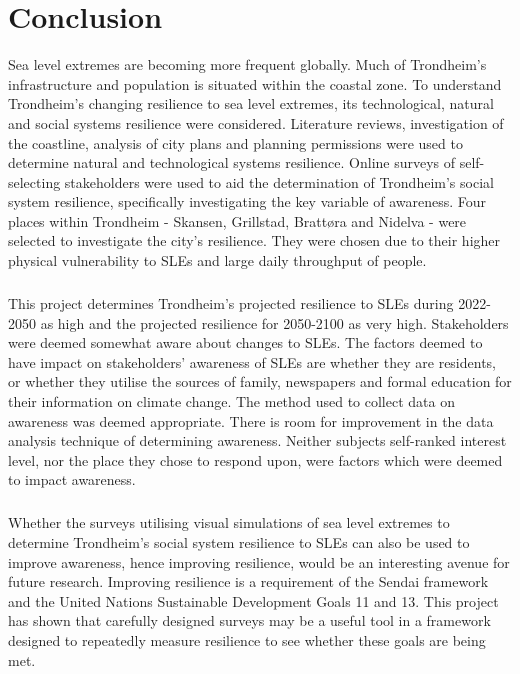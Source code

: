 

\chapter{Conclusion}

Sea level extremes are becoming more frequent globally. Much of Trondheim's infrastructure and population is situated within the coastal zone. To understand Trondheim's changing resilience to sea level extremes, its technological, natural and social systems resilience were considered. Literature reviews, investigation of the coastline, analysis of city plans and planning permissions were used to determine natural and technological systems resilience. Online surveys of self-selecting stakeholders were used to aid the determination of Trondheim's social system resilience, specifically investigating the key variable of awareness. Four places within Trondheim - Skansen, Grillstad, Brattøra and Nidelva - were selected to investigate the city's resilience. They were chosen due to their higher physical vulnerability to SLEs and large daily throughput of people.
\paragraph{}
This project determines Trondheim's projected resilience to SLEs during 2022-2050 as high and the projected resilience for 2050-2100 as very high. Stakeholders were deemed somewhat aware about changes to SLEs. The factors deemed to have impact on stakeholders' awareness of SLEs are whether they are residents, or whether they utilise the sources of family, newspapers and formal education for their information on climate change. The method used to collect data on awareness was deemed appropriate. There is room for improvement in the data analysis technique of determining awareness. Neither subjects self-ranked interest level, nor the place they chose to respond upon, were factors which were deemed to impact awareness.
\paragraph{}

Whether the surveys utilising visual simulations of sea level extremes to determine Trondheim's social system resilience to SLEs can also be used to improve awareness, hence improving resilience, would be an interesting avenue for future research. Improving resilience is a requirement of the Sendai framework and the United Nations Sustainable Development Goals 11 and 13. This project has shown that carefully designed surveys may be a useful tool in a framework designed to repeatedly measure resilience to see whether these goals are being met.
